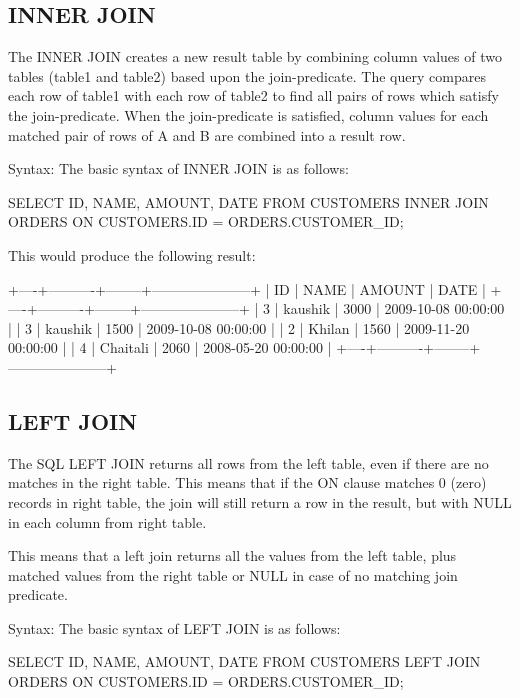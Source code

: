 \subsection{INNER JOIN}
The INNER JOIN creates a new result table by combining column values of two tables (table1 and table2) based upon the join-predicate. The query compares each row of table1 with 
each row of table2 to find all pairs of rows which satisfy the join-predicate. When the join-predicate is satisfied, column values for each matched pair of rows of A and B are 
combined into a result row.

Syntax:
The basic syntax of INNER JOIN is as follows:

\begin{Code}
	SELECT  ID, NAME, AMOUNT, DATE
	FROM CUSTOMERS
	INNER JOIN ORDERS
	ON CUSTOMERS.ID = ORDERS.CUSTOMER_ID;
\end{Code}

This would produce the following result:

\begin{Code}
		+----+----------+--------+---------------------+
		| ID | NAME     | AMOUNT | DATE                |
		+----+----------+--------+---------------------+
		|  3 | kaushik  |   3000 | 2009-10-08 00:00:00 |
		|  3 | kaushik  |   1500 | 2009-10-08 00:00:00 |
		|  2 | Khilan   |   1560 | 2009-11-20 00:00:00 |
		|  4 | Chaitali |   2060 | 2008-05-20 00:00:00 |
		+----+----------+--------+---------------------+
\end{Code}

\subsection{LEFT JOIN}
The SQL LEFT JOIN returns all rows from the left table, even if there are no matches in the right table. This means that if the ON clause matches 0 (zero) records in right table, 
the join will still return a row in the result, but with NULL in each column from right table.

This means that a left join returns all the values from the left table, plus matched values from the right table or NULL in case of no matching join predicate.

Syntax:
The basic syntax of LEFT JOIN is as follows:

\begin{Code}
	SELECT  ID, NAME, AMOUNT, DATE
	FROM CUSTOMERS
	LEFT JOIN ORDERS
	ON CUSTOMERS.ID = ORDERS.CUSTOMER_ID;
\end{Code}

